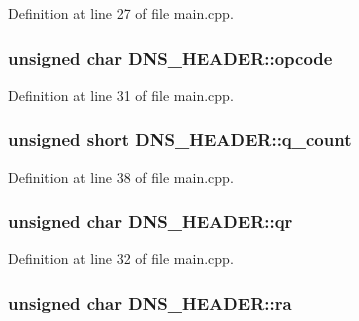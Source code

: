 Definition at line 27 of file main.\-cpp.

\hypertarget{struct_d_n_s___h_e_a_d_e_r_a07b70b04059dd68a0f7c1c879ccf1ef2}{
\subsubsection[{opcode}]{\setlength{\rightskip}{0pt plus 5cm}unsigned char D\-N\-S\-\_\-\-H\-E\-A\-D\-E\-R\-::opcode}}\label{struct_d_n_s___h_e_a_d_e_r_a07b70b04059dd68a0f7c1c879ccf1ef2}


Definition at line 31 of file main.\-cpp.

\hypertarget{struct_d_n_s___h_e_a_d_e_r_a6b9815b90208910759572254bf0905e5}{
\subsubsection[{q\-\_\-count}]{\setlength{\rightskip}{0pt plus 5cm}unsigned short D\-N\-S\-\_\-\-H\-E\-A\-D\-E\-R\-::q\-\_\-count}}\label{struct_d_n_s___h_e_a_d_e_r_a6b9815b90208910759572254bf0905e5}


Definition at line 38 of file main.\-cpp.

\hypertarget{struct_d_n_s___h_e_a_d_e_r_a874c920bbfec9e40d6b77e97128d1da9}{
\subsubsection[{qr}]{\setlength{\rightskip}{0pt plus 5cm}unsigned char D\-N\-S\-\_\-\-H\-E\-A\-D\-E\-R\-::qr}}\label{struct_d_n_s___h_e_a_d_e_r_a874c920bbfec9e40d6b77e97128d1da9}


Definition at line 32 of file main.\-cpp.

\hypertarget{struct_d_n_s___h_e_a_d_e_r_ab689629314dd78eb571b9d4d82feef8a}{
\subsubsection[{ra}]{\setlength{\rightskip}{0pt plus 5cm}unsigned char D\-N\-S\-\_\-\-H\-E\-A\-D\-E\-R\-::ra}}\label{struct_d_n_s___h_e_a_d_e_r_ab689629314dd78eb571b9d4d82feef8a}


